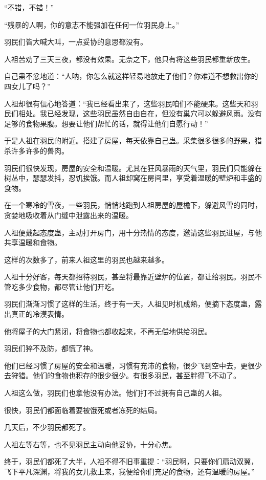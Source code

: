 \begin{this_body}
“不错，不错！”

“残暴的人啊，你的意志不能强加在任何一位羽民身上。”

羽民们皆大喊大叫，一点妥协的意思都没有。

人祖苦劝了三天三夜，都没有效果。无奈之下，他只有将这些羽民都重新放生。

自己蛊不忿地道：“人呐，你怎么就这样轻易地放走了他们？你难道不想救出你的四女儿了吗？”

人祖却很有信心地答道：“我已经看出来了，这些羽民咱们不能硬来。这些天和羽民们相处。我已经发现，这些羽民虽然自由自在，但没有巢穴可以躲避风雨。没有足够的食物果腹。想要让他们帮忙的话，就得让他们自愿行动！”

于是人祖在羽民的附近。搭建了房屋，每天依靠自己蛊。采集很多很多的野果，猎杀许多许多的兽肉。

羽民们很快发现，房屋的安全和温暖。尤其在狂风暴雨的天气里，羽民们只能躲在树丛中，瑟瑟发抖，忍饥挨饿。而人祖却窝在房间里，享受着温暖的壁炉和丰盛的食物。

在一个寒冷的雪夜，一些羽民，悄悄地跑到人祖房屋的屋檐下，躲避风雪的同时，贪婪地吸收着从门缝中泄露出来的温暖。

人祖便戴起态度蛊，主动打开房门，用十分热情的态度，邀请这些羽民进屋，与他共享温暖和食物。

这样的次数多了，前来人祖这里的羽民也越来越多。

人祖十分好客，每天都招待羽民，甚至将最靠近壁炉的位置，都让给羽民。羽民不管吃多少食物，都尽管让他们开吃。

羽民们渐渐习惯了这样的生活，终于有一天，人祖见时机成熟，便摘下态度蛊，露出真正的冷漠表情。

他将屋子的大门紧闭，将食物也都收起来，不再无偿地供给羽民。

羽民们猝不及防，都慌了神。

他们已经习惯了房屋的安全和温暖，习惯有充沛的食物，很少飞到空中去，更很少去狩猎。他们的食物也积存的很少很少。有很多羽民，甚至胖得飞不动了。

人祖这么做，羽民们也拿他没有办法。他们打不过拥有自己蛊的人祖。

很快，羽民们都面临着要被饿死或者冻死的结局。

几天后，不少羽民都死了。

人祖左等右等，也不见羽民主动向他妥协，十分心焦。

终于，羽民们都死了大半，人祖不得不旧事重提：“羽民啊，只要你们扇动双翼，飞下平凡深渊，将我的女儿救上来，我便给你们充足的食物，还有温暖的房屋。”


\end{this_body}
